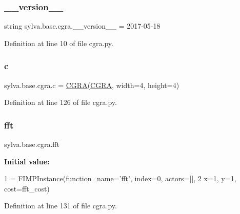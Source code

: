\subsubsection{\texorpdfstring{\+\_\+\+\_\+version\+\_\+\+\_\+}{\_\_version\_\_}}
{\footnotesize\ttfamily string sylva.\+base.\+cgra.\+\_\+\+\_\+version\+\_\+\+\_\+ = \textquotesingle{}2017-\/05-\/18\textquotesingle{}\hspace{0.3cm}{\ttfamily [private]}}



Definition at line 10 of file cgra.\+py.

\mbox{\label{namespacesylva_1_1base_1_1cgra_a4a25bc3c469d6472bfebb1c2089476ba}} 
\subsubsection{\texorpdfstring{c}{c}}
{\footnotesize\ttfamily sylva.\+base.\+cgra.\+c = \hyperlink{classsylva_1_1base_1_1cgra_1_1_c_g_r_a}{C\+G\+RA}(\textquotesingle{}\hyperlink{classsylva_1_1base_1_1cgra_1_1_c_g_r_a}{C\+G\+RA}\textquotesingle{}, width=4, height=4)}



Definition at line 126 of file cgra.\+py.

\mbox{\label{namespacesylva_1_1base_1_1cgra_abc1c6fdee4ec52dc2897a70f342d3df9}} 
\subsubsection{\texorpdfstring{fft}{fft}}
{\footnotesize\ttfamily sylva.\+base.\+cgra.\+fft}

{\bfseries Initial value\+:}
\begin{DoxyCode}
1 =  FIMPInstance(function\_name=\textcolor{stringliteral}{'fft'}, index=0, actors=[],
2                    x=1, y=1, cost=fft\_cost)
\end{DoxyCode}


Definition at line 131 of file cgra.\+py.

\mbox{\label{namespacesylva_1_1base_1_1cgra_adfa9387f3823068327754f28f8419f7b}} 
